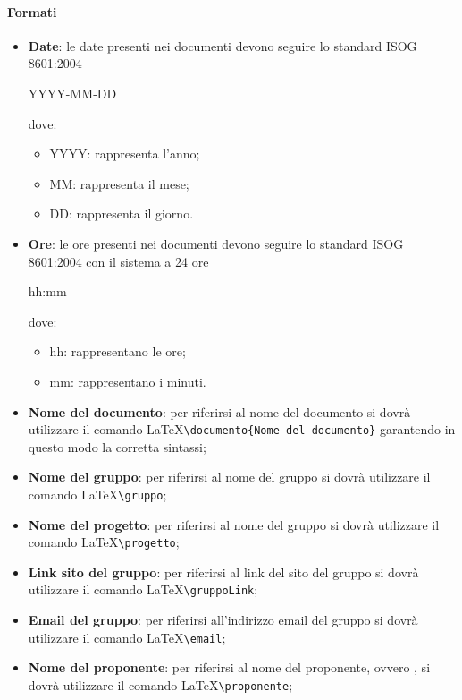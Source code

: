 \paragraph{Formati}
\begin{itemize}
   \item \textbf{Date}: le date presenti nei documenti devono seguire lo standard ISOG 8601:2004
   \begin{center}
     YYYY-MM-DD
   \end{center}
   dove:
   \begin{itemize}
     \item YYYY: rappresenta l'anno;
     \item MM: rappresenta il mese;
     \item DD: rappresenta il giorno.
   \end{itemize}
   \item \textbf{Ore}: le ore presenti nei documenti devono seguire lo standard ISOG 8601:2004 
   con il sistema a 24 ore
   \begin{center}
     hh:mm
   \end{center}
   dove:
   \begin{itemize}
     \item hh: rappresentano le ore;
     \item mm: rappresentano i minuti.
   \end{itemize}
   \item \textbf{Nome del documento}: per riferirsi al nome del documento si 
   dovrà utilizzare il comando \LaTeX   \verb|\documento{Nome del documento}| 
   garantendo in questo modo la corretta sintassi;
   \item \textbf{Nome del gruppo}: per riferirsi al nome del gruppo si dovrà 
   utilizzare il comando \LaTeX \verb|\gruppo|;
   \item \textbf{Nome del progetto}: per riferirsi al nome del gruppo si dovrà 
   utilizzare il comando \LaTeX \verb|\progetto|;
   \item \textbf{Link sito del gruppo}: per riferirsi al link del sito del gruppo si dovrà 
   utilizzare il comando \LaTeX \verb|\gruppoLink|;
   \item \textbf{Email del gruppo}: per riferirsi all'indirizzo email del gruppo si dovrà 
   utilizzare il comando \LaTeX \verb|\email|;
   \item \textbf{Nome del proponente}: per riferirsi al nome del proponente, ovvero \proponente, si dovrà 
   utilizzare il comando \LaTeX  \verb|\proponente|;
      \end{itemize}


